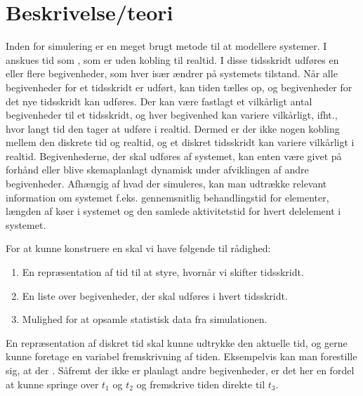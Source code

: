 \section{Beskrivelse/teori} \label{sec:des-teori}

Inden for simulering er \des en meget brugt metode til at modellere systemer. I 
\des anskues tid som , som er uden kobling til realtid. I disse tidsskridt udføres en eller flere begivenheder, som hver især ændrer på systemets tilstand. Når alle begivenheder for et tidsskridt er udført, kan tiden tælles op, og begivenheder for det nye tidsskridt kan udføres. Der kan være fastlagt et vilkårligt antal begivenheder til et tidsskridt, og hver begivenhed kan variere vilkårligt, ifht., hvor langt tid den tager at udføre i realtid. Dermed er der ikke nogen kobling mellem den diskrete tid og realtid, og et diskret tidsskridt kan variere vilkårligt i realtid. Begivenhederne, der skal udføres af systemet, kan enten være givet på forhånd eller blive skemaplanlagt dynamisk under afviklingen af andre begivenheder. 
Afhængig af hvad der simuleres, kan man udtrække relevant information om systemet f.eks. gennemsnitlig behandlingstid for elementer, længden af køer i systemet og den samlede aktivitetstid for hvert delelement i systemet.

For at kunne konstruere en \des skal vi have følgende til rådighed: 
\begin{enumerate}
\tightlist 
\item En repræsentation af tid til at styre, hvornår vi skifter tidsskridt.
\item En liste over begivenheder, der skal udføres i hvert tidsskridt.
\item Mulighed for at opsamle statistisk data fra simulationen. 
\end{enumerate}
En repræsentation af diskret tid skal kunne udtrykke den aktuelle tid,  og gerne kunne foretage en variabel fremskrivning af tiden. Eksempelvis kan man forestille sig, at der . Såfremt der ikke er planlagt andre begivenheder, er det her en fordel at kunne springe over $t_{1}$ og $t_{2}$ og fremskrive tiden direkte til $t_{3}$. 



